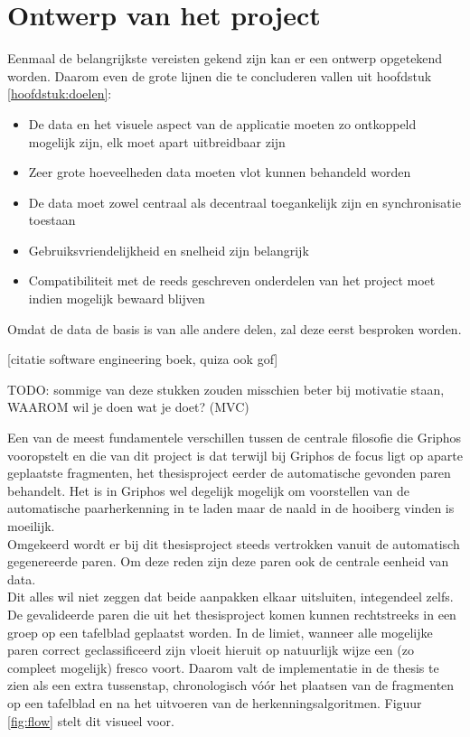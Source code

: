 \chapter{Ontwerp van het project}
\label{hoofdstuk:ontwerp}

Eenmaal de belangrijkste vereisten gekend zijn kan er een ontwerp opgetekend worden. Daarom even de grote lijnen die te concluderen vallen uit hoofdstuk \ref{hoofdstuk:doelen}:

\begin{itemize}
  \item De data en het visuele aspect van de applicatie moeten zo ontkoppeld mogelijk zijn, elk moet apart uitbreidbaar zijn
  \item Zeer grote hoeveelheden data moeten vlot kunnen behandeld worden
  \item De data moet zowel centraal als decentraal toegankelijk zijn en synchronisatie toestaan
  \item Gebruiksvriendelijkheid en snelheid zijn belangrijk
  \item Compatibiliteit met de reeds geschreven onderdelen van het project moet indien mogelijk bewaard blijven
\end{itemize}

Omdat de data de basis is van alle andere delen, zal deze eerst besproken worden.

[citatie software engineering boek, quiza ook gof]

TODO: sommige van deze stukken zouden misschien beter bij motivatie staan, WAAROM wil je doen wat je doet?
(MVC)

Een van de meest fundamentele verschillen tussen de centrale filosofie die Griphos vooropstelt en die van dit project is dat terwijl bij Griphos de focus ligt op aparte geplaatste fragmenten, het thesisproject eerder de automatische gevonden paren behandelt. Het is in Griphos wel degelijk mogelijk om voorstellen van de automatische paarherkenning in te laden maar de naald in de hooiberg vinden is moeilijk.\\

Omgekeerd wordt er bij dit thesisproject steeds vertrokken vanuit de automatisch gegenereerde paren. Om deze reden zijn deze paren ook de centrale eenheid van data.\\

Dit alles wil niet zeggen dat beide aanpakken elkaar uitsluiten, integendeel zelfs. De gevalideerde paren die uit het thesisproject komen kunnen rechtstreeks in een groep op een tafelblad geplaatst worden. In de limiet, wanneer alle mogelijke paren correct geclassificeerd zijn vloeit hieruit op natuurlijk wijze een (zo compleet mogelijk) fresco voort. Daarom valt de implementatie in de thesis te zien als een extra tussenstap, chronologisch v\'o\'or het plaatsen van de fragmenten op een tafelblad en na het uitvoeren van de herkenningsalgoritmen. Figuur \ref{fig:flow} stelt dit visueel voor.




